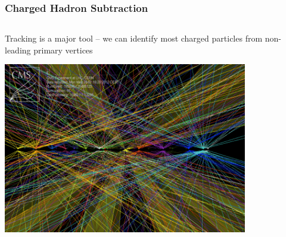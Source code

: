\begin{frame}[t]\frametitle{Charged Hadron Subtraction}
    \vspace*{-0.45cm}
    \begin{columns}[T]
    	\begin{column}{0.58\textwidth}
	    	Tracking is a major tool -- we can identify most charged particles from non-leading primary vertices

	    	\begin{center}
	    		\includegraphics[width=0.8\textwidth]{images/pileup_mitigation/pileup-vertices-colored.png}
	    	\end{center}


\end{column}
\end{columns}
\end{frame}
